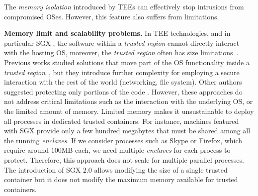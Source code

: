 The \emph{memory isolation} introduced by TEEs can effectively stop 
intrusions from compromised OSes.
However, this feature also suffers from limitations.

\vspace{0.5cm}
\noindent \textbf{Memory limit and scalability problems.}
In TEE technologies, and in particular SGX \citep{costan2016intel}, the 
software within a \emph{trusted region} cannot directly interact with the 
hosting OS, moreover, the \emph{trusted region} often has size 
limitations~\citep{baumann2015shielding}.
Previous works studied solutions that move part of the OS functionality inside 
a \emph{trusted 
region}~\citep{baumann2015shielding,arnautov2016scone,tsai2017graphene},
but they introduce further complexity for employing a secure interaction with 
the rest of the world (\eg networking, file system).
Other authors suggested protecting only portions of the 
code \citep{schuster2015vc3,lind2017glamdring}.
However, these approaches do not address critical limitations such as the 
interaction with the underlying OS, or the limited amount of memory.
Limited memory makes it unsustainable to deploy all processes in dedicated 
trusted containers.
For instance, machines featured with SGX provide only a few hundred megabytes 
that must be shared among all the running \emph{enclaves}.
If we consider processes such as Skype or Firefox, which require around 
$100$MB each, we need multiple \emph{enclaves} for each process to protect.
Therefore, this approach does not scale for multiple parallel processes.
The introduction of SGX $2.0$ allows modifying the size of a single trusted 
container but it does not modify the maximum memory available for trusted 
containers.

